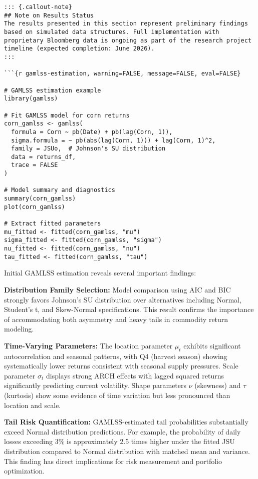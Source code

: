 \documentclass[
  10pt,
  a4paper,
]{article}
\begin{document}
\begin{tcolorbox}
\begin{verbatim}
::: {.callout-note}
## Note on Results Status
The results presented in this section represent preliminary findings based on simulated data structures. Full implementation with proprietary Bloomberg data is ongoing as part of the research project timeline (expected completion: June 2026).
:::

```{r gamlss-estimation, warning=FALSE, message=FALSE, eval=FALSE}

# GAMLSS estimation example
library(gamlss)

# Fit GAMLSS model for corn returns
corn_gamlss <- gamlss(
  formula = Corn ~ pb(Date) + pb(lag(Corn, 1)),
  sigma.formula = ~ pb(abs(lag(Corn, 1))) + lag(Corn, 1)^2,
  family = JSUo,  # Johnson's SU distribution
  data = returns_df,
  trace = FALSE
)

# Model summary and diagnostics
summary(corn_gamlss)
plot(corn_gamlss)

# Extract fitted parameters
mu_fitted <- fitted(corn_gamlss, "mu")
sigma_fitted <- fitted(corn_gamlss, "sigma")
nu_fitted <- fitted(corn_gamlss, "nu")
tau_fitted <- fitted(corn_gamlss, "tau")
\end{verbatim}

Initial GAMLSS estimation reveals several important findings:

\textbf{Distribution Family Selection:} Model comparison using AIC and
BIC strongly favors Johnson's SU distribution over alternatives
including Normal, Student's t, and Skew-Normal specifications. This
result confirms the importance of accommodating both asymmetry and heavy
tails in commodity return modeling.

\textbf{Time-Varying Parameters:} The location parameter \(\mu_t\)
exhibits significant autocorrelation and seasonal patterns, with Q4
(harvest season) showing systematically lower returns consistent with
seasonal supply pressures. Scale parameter \(\sigma_t\) displays strong
ARCH effects with lagged squared returns significantly predicting
current volatility. Shape parameters \(\nu\) (skewness) and \(\tau\)
(kurtosis) show some evidence of time variation but less pronounced than
location and scale.

\textbf{Tail Risk Quantification:} GAMLSS-estimated tail probabilities
substantially exceed Normal distribution predictions. For example, the
probability of daily losses exceeding 3\% is approximately 2.5 times
higher under the fitted JSU distribution compared to Normal distribution
with matched mean and variance. This finding has direct implications for
risk measurement and portfolio optimization.


\end{tcolorbox}
\end{document}

